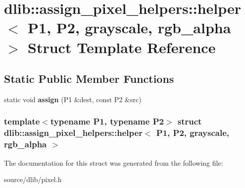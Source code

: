 \hypertarget{structdlib_1_1assign__pixel__helpers_1_1helper_3_01P1_00_01P2_00_01grayscale_00_01rgb__alpha_01_4}{
\section{dlib::assign\_\-pixel\_\-helpers::helper$<$ P1, P2, grayscale, rgb\_\-alpha $>$ Struct Template Reference}
\label{structdlib_1_1assign__pixel__helpers_1_1helper_3_01P1_00_01P2_00_01grayscale_00_01rgb__alpha_01_4}
}
\subsection*{Static Public Member Functions}
\begin{DoxyCompactItemize}
\item 
\hypertarget{structdlib_1_1assign__pixel__helpers_1_1helper_3_01P1_00_01P2_00_01grayscale_00_01rgb__alpha_01_4_aceab20bb1b3748b3c8597a9afc40dd2a}{
static void {\bfseries assign} (P1 \&dest, const P2 \&src)}
\label{structdlib_1_1assign__pixel__helpers_1_1helper_3_01P1_00_01P2_00_01grayscale_00_01rgb__alpha_01_4_aceab20bb1b3748b3c8597a9afc40dd2a}

\end{DoxyCompactItemize}
\subsubsection*{template$<$typename P1, typename P2$>$ struct dlib::assign\_\-pixel\_\-helpers::helper$<$ P1, P2, grayscale, rgb\_\-alpha $>$}



The documentation for this struct was generated from the following file:\begin{DoxyCompactItemize}
\item 
source/dlib/pixel.h\end{DoxyCompactItemize}
